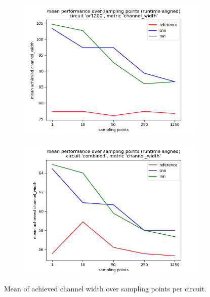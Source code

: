 \begin{figure}[H]
\begin{subfigure}[b]{0.49\linewidth}
		\includegraphics[width=\linewidth]{plots/eval-or1200-chan-width-mean-full.png}
	\end{subfigure}
	\begin{subfigure}[b]{0.49\linewidth}
		\includegraphics[width=\linewidth]{plots/eval-combined-chan-width-mean-full.png}
	\end{subfigure}
	\caption{Mean of achieved channel width over sampling points per circuit.}
	\label{fig:eval-chan-width-mean}
\end{figure}

